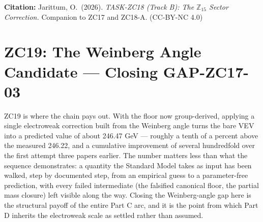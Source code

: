 \documentclass[12pt, a4paper]{article}
\begin{document}
\bigskip
\begin{center}
\textbf{Citation:} Jarittum, O.\ (2026).
\textit{TASK-ZC18 (Track B): The $\mathbb{Z}_{15}$ Sector Correction.}
Companion to ZC17 and ZC18-A. (CC-BY-NC 4.0)
\end{center}

\bigskip


\section{ZC19: The Weinberg Angle Candidate --- Closing GAP-ZC17-03}
\label{sec:zc19-weinberg}

ZC19 is where the chain pays out. With the floor now group-derived, applying a
single electroweak correction built from the Weinberg angle turns the bare VEV
into a predicted value of about 246.47 GeV --- roughly a tenth of a percent above
the measured 246.22, and a cumulative improvement of several hundredfold over the
first attempt three papers earlier. The number matters less than what the
sequence demonstrates: a quantity the Standard Model takes as input has been
walked, step by documented step, from an empirical guess to a parameter-free
prediction, with every failed intermediate (the falsified canonical floor, the
partial mass closure) left visible along the way. Closing the Weinberg-angle gap here is
the structural payoff of the entire Part C arc, and it is the point from which
Part D inherits the electroweak scale as settled rather than assumed.
\end{document}
